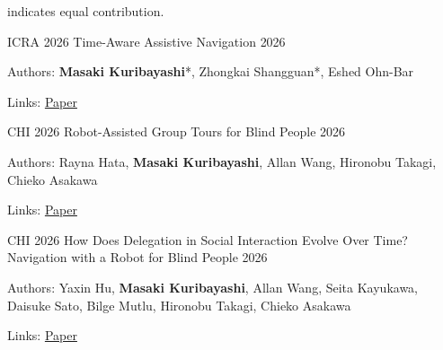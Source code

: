 
\begin{cvparagraph}
\textasteriskcentered{} indicates equal contribution.
\end{cvparagraph}


\begin{cventries}

  \cventry
    {ICRA 2026}
    {Time-Aware Assistive Navigation}
    {}
    {2026}
    {
      \begin{cvitems}
        \item {Authors: \textbf{Masaki Kuribayashi}*, Zhongkai Shangguan*, Eshed Ohn-Bar}
        \item {Links: \href{https://chestnutforestlabo.github.io/website/data/project/masaki_kuribayashi_icra_2026/paper.pdf}{Paper}}
      \end{cvitems}
    }

  \cventry
    {CHI 2026}
    {Robot-Assisted Group Tours for Blind People}
    {}
    {2026}
    {
      \begin{cvitems}
        \item {Authors: Rayna Hata, \textbf{Masaki Kuribayashi}, Allan Wang, Hironobu Takagi, Chieko Asakawa}
        \item {Links: \href{https://chestnutforestlabo.github.io/website/data/project/rayna_hata_chi_2026/paper.pdf}{Paper}}
      \end{cvitems}
    }

  \cventry
    {CHI 2026}
    {How Does Delegation in Social Interaction Evolve Over Time? Navigation with a Robot for Blind People}
    {}
    {2026}
    {
      \begin{cvitems}
        \item {Authors: Yaxin Hu, \textbf{Masaki Kuribayashi}, Allan Wang, Seita Kayukawa, Daisuke Sato, Bilge Mutlu, Hironobu Takagi, Chieko Asakawa}
        \item {Links: \href{https://chestnutforestlabo.github.io/website/data/project/yaxin_hu_chi_2026/paper.pdf}{Paper}}
      \end{cvitems}
    }


\end{cventries}
